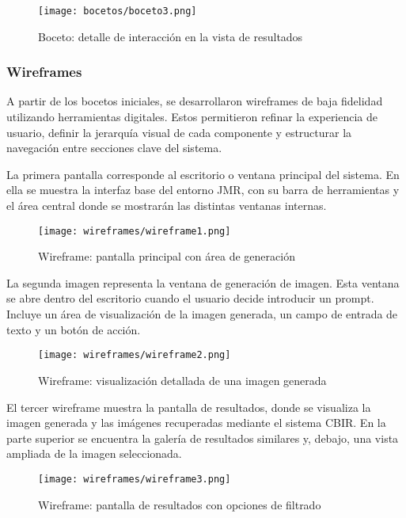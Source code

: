 \begin{figure}[H]
    \centering
    \texttt{[image: bocetos/boceto3.png]}
    \caption{Boceto: detalle de interacción en la vista de resultados}
    \label{fig:boceto3}
\end{figure}


\subsubsection{Wireframes}

A partir de los bocetos iniciales, se desarrollaron wireframes de baja fidelidad utilizando herramientas digitales. Estos permitieron refinar la experiencia de usuario, definir la jerarquía visual de cada componente y estructurar la navegación entre secciones clave del sistema.

La primera pantalla corresponde al escritorio o ventana principal del sistema. En ella se muestra la interfaz base del entorno JMR, con su barra de herramientas y el área central donde se mostrarán las distintas ventanas internas.

\begin{figure}[H]
    \centering
    \texttt{[image: wireframes/wireframe1.png]}
    \caption{Wireframe: pantalla principal con área de generación}
    \label{fig:wireframe1}
\end{figure}

La segunda imagen representa la ventana de generación de imagen. Esta ventana se abre dentro del escritorio cuando el usuario decide introducir un prompt. Incluye un área de visualización de la imagen generada, un campo de entrada de texto y un botón de acción.

\begin{figure}[H]
    \centering
    \texttt{[image: wireframes/wireframe2.png]}
    \caption{Wireframe: visualización detallada de una imagen generada}
    \label{fig:wireframe3}
\end{figure}

El tercer wireframe muestra la pantalla de resultados, donde se visualiza la imagen generada y las imágenes recuperadas mediante el sistema CBIR. En la parte superior se encuentra la galería de resultados similares y, debajo, una vista ampliada de la imagen seleccionada.

\begin{figure}[H]
    \centering
    \texttt{[image: wireframes/wireframe3.png]}
    \caption{Wireframe: pantalla de resultados con opciones de filtrado}
    \label{fig:wireframe2}
\end{figure}

